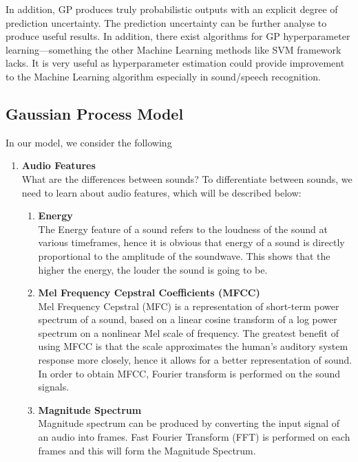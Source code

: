 \documentclass{article}
\begin{document}
	In addition, GP produces truly probabilistic outputs with an explicit degree of prediction uncertainty. 
	The prediction uncertainty can be further analyse to produce useful results. In addition, there exist algorithms for GP hyperparameter 
	learning—something the other Machine Learning methods like SVM framework lacks. It is very useful as hyperparameter estimation could provide 
	improvement to the Machine Learning algorithm especially in sound/speech recognition. \cite{Hashimoto2015} \\
	
	\subsection{Gaussian Process Model}\label{audio_feats}
	In our model, we consider the following
	\begin{enumerate}
		\item \textbf{Audio Features}	\\
		What are the differences between sounds? To differentiate between sounds, we need to learn about audio features, which will be described below:
		\begin{enumerate}
			\item \textbf{Energy}	\\
			The Energy feature of a sound refers to the loudness of the sound at various timeframes, 
			hence it is obvious that energy of a sound is directly proportional to the amplitude of the soundwave. 
			This shows that the higher the energy, the louder the sound is going to be.	
		
			\item \textbf{Mel Frequency Cepstral Coefficients (MFCC)} \\
			Mel Frequency Cepstral (MFC) is a representation of short-term power spectrum of a sound, 
			based on a linear cosine transform of a log power spectrum on a nonlinear Mel scale of frequency. 
			The greatest benefit of using MFCC is that the scale approximates the 
			human's auditory system response more closely, hence it allows for a better representation of sound. 
			In order to obtain MFCC, Fourier transform is performed on the sound signals.	
		
			\item \textbf{Magnitude Spectrum} \\
			Magnitude spectrum can be produced by converting the input signal of an audio into frames. 
			Fast Fourier Transform (FFT) is performed on each frames and this will form the Magnitude Spectrum.
			

\end{enumerate}
\end{enumerate}
\end{document}
